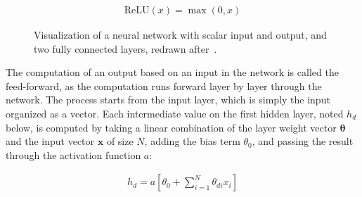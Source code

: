 \documentclass[english,twoside,openright]{UH_DS_MSc}
\begin{document}
\begin{align}
    \text{ReLU}(x) = \max(0, x)
    \label{eq:relu}
\end{align}

\begin{figure}[h]
    \centering
\caption{Visualization of a neural network with scalar input and output, and two fully connected layers, redrawn after~\cite{princebook}.}
\label{image:neuralnet}
\end{figure}


The computation of an output based on an input in the network is called the 
feed-forward, as the computation runs forward layer by layer through the 
network. The process starts from the input layer, which is simply the input 
organized as a vector. Each intermediate value on the first hidden layer, noted $h_d$ below,
is computed by taking a linear combination of the layer weight vector $\mathbf{\theta}$ and 
the input vector $\mathbf{x}$ of size $N$, adding the 
bias term $\theta_0$, and passing the result through the activation function $a$:

\begin{align}
    h_d = a\left[ \theta_{0} + \sum_{i=1}^{N}\theta_{di}x_{i} \right]
\label{eq:fc_layer}
\end{align}
\end{document}
